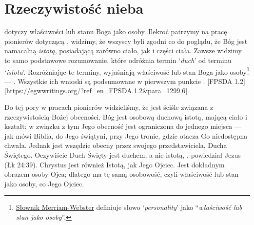 \chapter{Rzeczywistość nieba}

 dotyczy właściwości lub stanu Boga jako osoby. Ilekroć patrzymy na pracę pionierów dotyczącą , widzimy, że wszyscy byli zgodni co do poglądu, że Bóg jest namacalną \textit{istotą}, posiadającą zarówno ciało, jak i części ciała. Zawsze widzimy to samo podstawowe rozumowanie, które odróżnia termin ‘\textit{duch}’ od terminu ‘\textit{istota}’. Rozróżniając te terminy, wyjaśniają właściwość lub stan Boga jako osoby\footnote{\href{https://www.merriam-webster.com/dictionary/personality}{Słownik Merriam-Webster} definiuje słowo ‘\textit{personality}’ jako “\textit{właściwość lub stan jako osoby}”.} — . Wszystkie ich wnioski są podsumowane w pierwszym punkcie . [FPSDA 1.2][https://egwwritings.org/?ref=en\_FPSDA.1.2&para=1299.6]

Do tej pory w pracach pionierów widzieliśmy, że  jest ściśle związana z rzeczywistością Bożej obecności. Bóg jest osobową duchową istotą, mającą ciało i kształt; w związku z tym Jego obecność jest ograniczona do jednego miejsca — jak mówi Biblia, do Jego świątyni, przy Jego tronie, gdzie otacza Go niedostępna chwała. Jednak jest wszędzie obecny przez swojego przedstawiciela, Ducha Świętego. Oczywiście Duch Święty jest duchem, a nie istotą, , powiedział Jezus (Łk 24:39). Chrystus jest również Istotą, jak Jego Ojciec. Jest dokładnym obrazem osoby Ojca; dlatego ma tę samą osobowość, czyli właściwość lub stan jako osoby, co Jego Ojciec.

